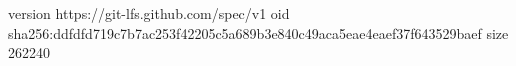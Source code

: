 version https://git-lfs.github.com/spec/v1
oid sha256:ddfdfd719c7b7ac253f42205c5a689b3e840c49aca5eae4eaef37f643529baef
size 262240
